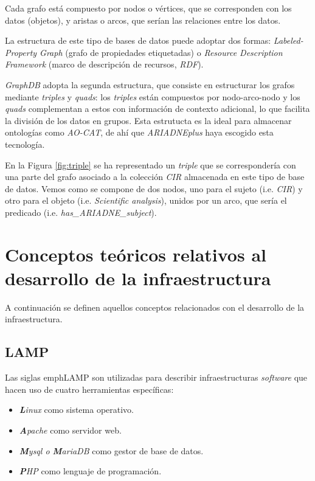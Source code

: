 Cada grafo está compuesto por nodos o vértices, que se
corresponden con los datos (objetos), y aristas o arcos, que serían las
relaciones entre los datos. 

La estructura de este tipo de bases de datos
puede adoptar dos formas: \emph{Labeled-Property Graph} (grafo de
propiedades etiquetadas) o \emph{Resource Description Framework} (marco
de descripción de recursos, \emph{RDF}).

\emph{GraphDB} adopta la segunda estructura, que consiste en estructurar los
grafos mediante \emph{triples} y \emph{quads}: los \emph{triples} están
compuestos por nodo-arco-nodo y los \emph{quads} complementan a estos
con información de contexto adicional, lo que facilita la división de
los datos en grupos. Esta estrutucta es la ideal para almacenar
ontologías como \emph{AO-CAT}, de ahí que \emph{ARIADNEplus} haya escogido esta
tecnología.


En la Figura \ref{fig:triple} se ha representado un \emph{triple} que se
correspondería con una parte del grafo asociado a la colección \emph{CIR}
almacenada en este tipo de base de datos. Vemos como se compone de dos
nodos, uno para el sujeto (i.e. \emph{CIR}) y otro para el objeto (i.e. \emph{Scientific
analysis}), unidos por un arco, que sería el predicado
(i.e. \emph{has\_ARIADNE\_subject}).

\section{Conceptos teóricos relativos al desarrollo de la infraestructura}

A continuación se definen aquellos conceptos relacionados con el
desarrollo de la infraestructura.

\subsection{LAMP}

Las siglas emph{LAMP} \cite{wiki:lamp} son utilizadas para describir infraestructuras
\emph{software} que hacen uso de cuatro herramientas específicas:

\begin{itemize}
\tightlist
\item
  \emph{\textbf{L}inux} como sistema operativo.
\item
  \emph{\textbf{A}pache} como servidor web.
\item
  \emph{\textbf{M}ysql o \textbf{M}ariaDB} como gestor de base de datos.
\item
  \emph{\textbf{P}HP} como lenguaje de programación.
\end{itemize}

